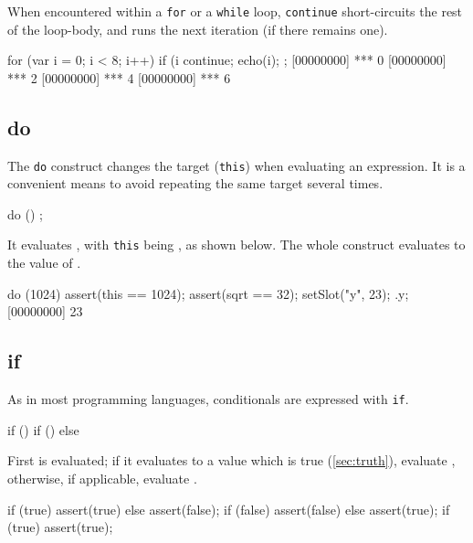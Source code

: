 When encountered within a \lstinline|for| or a \lstinline|while| loop,
\lstinline|continue| short-circuits the rest of the loop-body, and
runs the next iteration (if there remains one).

\begin{urbiscript}
for (var i = 0; i < 8; i++)
{
  if (i %
    continue;
  echo(i);
};
[00000000] *** 0
[00000000] *** 2
[00000000] *** 4
[00000000] *** 6
\end{urbiscript}

\subsection{do}

The \lstinline|do| construct changes the target (\lstinline|this|)
when evaluating an expression.  It is a convenient means to avoid
repeating the same target several times.

\begin{urbiunchecked}
do ()
{
};
\end{urbiunchecked}

It evaluates , with \lstinline|this| being , as
shown below.  The whole construct evaluates to the value
of .

\begin{urbiscript}
do (1024)
{
  assert(this == 1024);
  assert(sqrt == 32);
  setSlot("y", 23);
}.y;
[00000000] 23
\end{urbiscript}


\subsection{if}
\label{sec:lang:if}
As in most programming languages, conditionals are expressed with
\lstinline|if|.

\begin{urbiunchecked}
if () 
if ()  else 
\end{urbiunchecked}

First  is evaluated; if it evaluates to a value which
is true (\autoref{sec:truth}), evaluate , otherwise,
if applicable, evaluate .

\begin{urbiscript}
if (true) assert(true) else assert(false);
if (false) assert(false) else assert(true);
if (true) assert(true);
\end{urbiscript}

